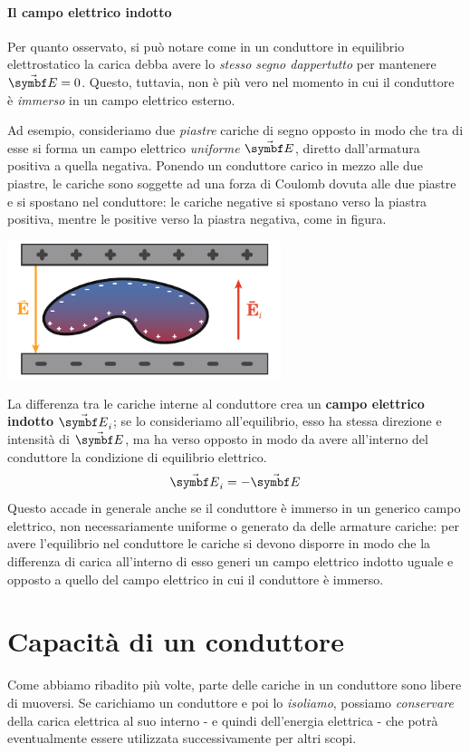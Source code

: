\paragraph{Il campo elettrico indotto}
Per quanto osservato, si può notare come in un conduttore in equilibrio elettrostatico la carica debba avere lo \textit{stesso segno dappertutto} per mantenere $\vba{E}=0$. Questo, tuttavia, non è più vero nel momento in cui il conduttore è \textit{immerso} in un campo elettrico esterno.

Ad esempio, consideriamo due \textit{piastre} cariche di segno opposto in modo che tra di esse si forma un campo elettrico \textit{uniforme} $\vba{E}$, diretto dall'armatura positiva a quella negativa.
Ponendo un conduttore carico in mezzo alle due piastre, le cariche sono soggette ad una forza di Coulomb dovuta alle due piastre e si spostano nel conduttore: le cariche negative si spostano verso la piastra positiva, mentre le positive verso la piastra negativa, come in figura.
\begin{center}
	\includegraphics[width=0.6\textwidth]{images/chp4/chp4campoindotto.pdf}
\end{center}
La differenza tra le cariche interne al conduttore crea un \textbf{campo elettrico indotto} $\vba{E}_i$; se lo consideriamo all'equilibrio, esso ha stessa direzione e intensità di $\vba{E}$, ma ha verso opposto in modo da avere all'interno del conduttore la condizione di equilibrio elettrico.
\begin{equation}
	\vba{E}_i=-\vba{E}
\end{equation}
Questo accade in generale anche se il conduttore è immerso in un generico campo elettrico, non necessariamente uniforme o generato da delle armature cariche: per avere l'equilibrio nel conduttore le cariche si devono disporre in modo che la differenza di carica all'interno di esso generi un campo elettrico indotto uguale e opposto a quello del campo elettrico in cui il conduttore è immerso.
\section{Capacità di un conduttore}
Come abbiamo ribadito più volte, parte delle cariche in un conduttore sono libere di muoversi. Se carichiamo un conduttore e poi lo \textit{isoliamo}, possiamo \textit{conservare} della carica elettrica al suo interno - e quindi dell'energia elettrica - che potrà eventualmente essere utilizzata successivamente per altri scopi.

